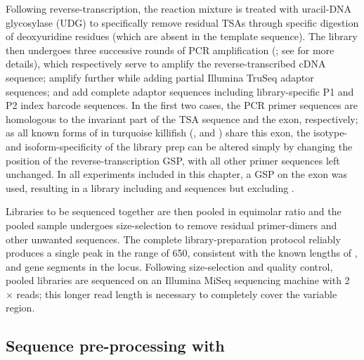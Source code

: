 Following reverse-transcription, the reaction mixture is treated with uracil-DNA glycosylase (UDG) to specifically remove residual TSAs through specific digestion of deoxyuridine residues (which are absent in the template sequence). The library then undergoes three successive rounds of PCR amplification (; see for more details), which respectively serve to amplify the reverse-transcribed cDNA sequence; amplify further while adding partial Illumina TruSeq adaptor sequences; and add complete adaptor sequences including library-specific P1 and P2 index barcode sequences. In the first two cases, the PCR primer sequences are homologous to the invariant part of the TSA sequence and the  exon, respectively; as all known forms of \igh{} in turquoise killifish (,  and ) share this exon, the isotype- and isoform-specificity of the library prep can be altered simply by changing the position of the reverse-transcription GSP, with all other primer sequences left unchanged. In all experiments included in this chapter, a GSP on the  exon was used, resulting in a library including  and  sequences but excluding . %

Libraries to be sequenced together are then pooled in equimolar ratio and the pooled sample undergoes size-selection to remove residual primer-dimers and other unwanted sequences. The complete library-preparation protocol reliably produces a single peak in the range of 650, consistent with the known lengths of \vh, \dh and \jh gene segments in the \Nfu locus. %
Following size-selection and quality control, pooled libraries are sequenced on an Illumina MiSeq sequencing machine with 2 ×  reads; this longer read length is necessary to completely cover the variable region. %

\subsection{Sequence pre-processing with }
\label{sec:igseq_protocol_preprocess}


